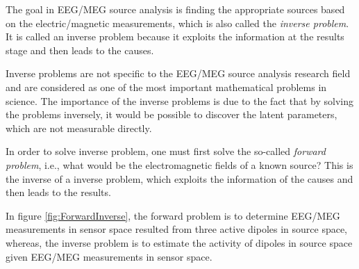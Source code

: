The goal in EEG/MEG source analysis is finding the appropriate sources based on the electric/magnetic measurements, which is also called the \emph{inverse problem}.
It is called an inverse problem because it exploits the information at the results stage and then leads to the causes.

Inverse problems are not specific to the EEG/MEG source analysis research field and are considered as one of the most important mathematical problems in science.
The importance of the inverse problems is due to the fact that by solving the problems inversely, it would be possible to discover the latent parameters, which are not measurable directly.

In order to solve inverse problem, one must first solve the so-called \emph{forward problem}, i.e., what would be the electromagnetic fields of a known source?
This is the inverse of a inverse problem, which exploits the information of the causes and then leads to the results.

In figure \ref{fig:ForwardInverse}, the forward problem is to determine EEG/MEG measurements in sensor space resulted from three active dipoles in source space, whereas, the inverse problem is to estimate the activity of dipoles in source space given EEG/MEG measurements in sensor space.

\FloatBarrier